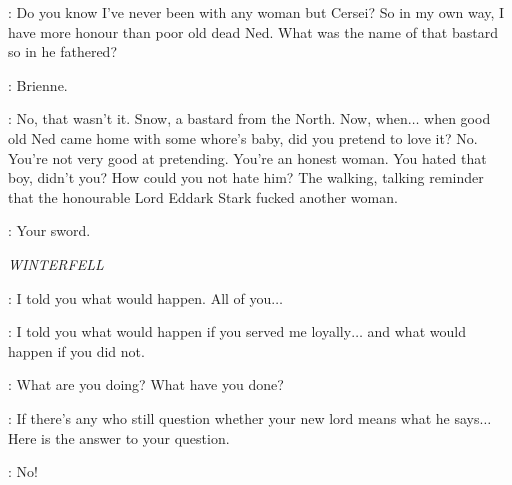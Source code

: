 \JAIME: Do you know I've never been with any woman but Cersei? So in my own way, I have more honour than poor old dead Ned. What was the name of that bastard so in he fathered?

\CATELYN: Brienne.


\JAIME: No, that wasn't it. Snow, a bastard from the North. Now, when$\ldots$ when good old Ned came home with some whore's baby, did you pretend to love it? No. You're not very good at pretending. You're an honest woman. You hated that boy, didn't you? How could you not hate him? The walking, talking reminder that the honourable Lord Eddark Stark fucked another woman.

\CATELYN:  Your sword.



\scene

\textit{WINTERFELL}


\THEON: I told you what would happen. All of you$\ldots$


\THEON: I told you what would happen if you served me loyally$\ldots$ and what would happen if you did not.

\LUWIN: What are you doing? What have you done?

\THEON: If there's any who still question whether your new lord means what he says$\ldots$ Here is the answer to your question.


\LUWIN: No!


